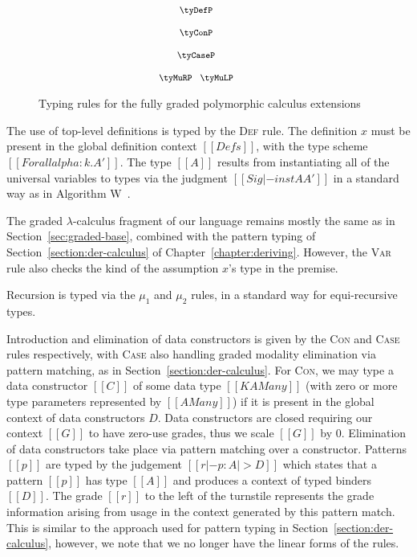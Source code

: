 \begin{figure}[t]
    \begin{align*}
    {\footnotesize{
    \hspace{-2.5em}
    \begin{array}{c}
    \tyDefP
        \\[1.25em]
    \tyConP
        \\[1.25em]
    \tyCaseP
        \\[1.25em]
    \tyMuRP
    \;\;\;
    \tyMuLP
    \end{array}
    }}
    \end{align*}
    \vspace{-1em}
    \caption{Typing rules for the fully graded polymorphic calculus extensions}
    \label{fig:typing-graded-poly2}
    \vspace{-0.5em}
\end{figure}
The use of top-level definitions is typed by the \textsc{Def} rule. The
definition $x$ must be present in the global definition context $[[ Defs ]]$,
with the type scheme $[[  Forall alpha : k . A' ]]$. The type $[[ A ]]$ results
from instantiating all of the universal variables to types via the judgment $[[
Sig |- inst A A' ]]$ in a standard way as in Algorithm
W~\citep{milner1978theory}.

The graded $\lambda$-calculus fragment of our language remains mostly the same
as in Section~\ref{sec:graded-base}, combined with the pattern typing of
Section~\ref{section:der-calculus} of Chapter~\ref{chapter:deriving}. However,
the \textsc{Var} rule also checks the kind of the assumption $x$'s type in the
premise.  

Recursion is typed via the $\mu_1$ and $\mu_2$ rules, in a standard
way for equi-recursive types.

Introduction and elimination of data constructors is given by the \textsc{Con}
and \textsc{Case} rules respectively, with \textsc{Case} also handling graded
modality elimination via pattern matching, as in
Section~\ref{section:der-calculus}. For \textsc{Con}, we may type a data
constructor $[[C]]$ of some data type $[[ K {A Many} ]]$ (with zero or more type
parameters represented by $[[ {A Many} ]]$) if it is present in the global
context of data constructors $D$. Data constructors are closed requiring our
context $[[ G ]]$ to have zero-use grades, thus we scale $[[G]]$ by $0$.
Elimination of data constructors take place via pattern matching over a
constructor. Patterns $[[p]]$ are typed by the judgement $[[ r |- p : A |> D ]]$
which states that a pattern $[[p]]$ has type $[[A]]$ and produces a context of
typed binders $[[D]]$. The grade $[[r]]$ to the left of the turnstile represents
the grade information arising from usage in the context generated by this
pattern match. This is similar to the approach used for pattern typing in
Section~\ref{section:der-calculus}, however, we note that we no longer have the
linear forms of the rules. 

